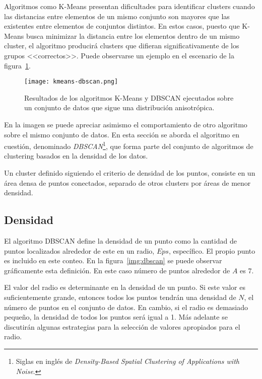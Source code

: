 Algoritmos como K-Means presentan dificultades para identificar clusters cuando las distancias entre elementos de un mismo conjunto son mayores que las existentes entre elementos de conjuntos distintos.
En estos casos, puesto que K-Means busca minimizar la distancia entre los elementos dentro de un mismo cluster, el algoritmo producirá clusters que difieran significativamente de los grupos <<correctos>>.
Puede observarse un ejemplo en el escenario de la figura~\ref{img:kmeans-dbscan}.

\begin{figure}[!h]
    \centering
    \texttt{[image: kmeans-dbscan.png]}
    \caption{Resultados de los algoritmos K-Means y DBSCAN ejecutados sobre un conjunto de datos que sigue una distribución anisotrópica.}
    \label{img:kmeans-dbscan}
\end{figure}

En la imagen se puede apreciar asimismo el comportamiento de otro algoritmo sobre el mismo conjunto de datos.
En esta sección se aborda el algoritmo en cuestión, denominado \textit{DBSCAN}\footnote{Siglas en inglés de \textit{Density-Based Spatial Clustering of Applications with Noise}.}, que forma parte del conjunto de algoritmos de clustering basados en la densidad de los datos.

Un cluster definido siguiendo el criterio de densidad de los puntos, consiste en un área densa de puntos conectados, separado de otros clusters por áreas de menor densidad.

\subsection{Densidad}\label{subsec:densidad}

El algoritmo DBSCAN define la densidad de un punto como la cantidad de puntos localizados alrededor de este en un radio, $Eps$, específico.
El propio punto es incluido en este conteo.
En la figura~\ref{img:dbscan} se puede observar gráficamente esta definición.
En este caso número de puntos alrededor de $A$ es 7.

El valor del radio es determinante en la densidad de un punto.
Si este valor es suficientemente grande, entonces todos los puntos tendrán una densidad de $N$, el número de puntos en el conjunto de datos.
En cambio, si el radio es demasiado pequeño, la densidad de todos los puntos será igual a 1.
Más adelante se discutirán algunas estrategias para la selección de valores apropiados para el radio.

